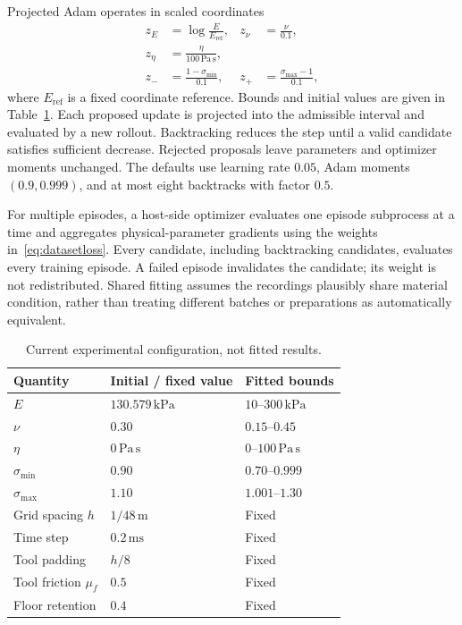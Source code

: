 Projected Adam operates in scaled coordinates
\begin{equation}
 \begin{aligned}
 z_E&=\log\frac{E}{E_{\mathrm{ref}}}, & z_\nu&=\frac{\nu}{0.1},\\
 z_\eta&=\frac{\eta}{100\,\mathrm{Pa\,s}},\\
 z_-&=\frac{1-\sigma_{\min}}{0.1}, & z_+&=\frac{\sigma_{\max}-1}{0.1},
 \end{aligned}
\end{equation}
where $E_{\mathrm{ref}}$ is a fixed coordinate reference. Bounds and initial values are given in Table~\ref{tab:settings}. Each proposed update is projected into the admissible interval and evaluated by a new rollout. Backtracking reduces the step until a valid candidate satisfies sufficient decrease. Rejected proposals leave parameters and optimizer moments unchanged. The defaults use learning rate $0.05$, Adam moments $(0.9,0.999)$, and at most eight backtracks with factor $0.5$.

For multiple episodes, a host-side optimizer evaluates one episode subprocess at a time and aggregates physical-parameter gradients using the weights in~\eqref{eq:datasetloss}. Every candidate, including backtracking candidates, evaluates every training episode. A failed episode invalidates the candidate; its weight is not redistributed. Shared fitting assumes the recordings plausibly share material condition, rather than treating different batches or preparations as automatically equivalent.

\begin{table}[t]
\centering
\caption{Current experimental configuration, not fitted results.}
\label{tab:settings}
\small
\begin{tabular}{@{}lll@{}}
\toprule
Quantity & Initial / fixed value & Fitted bounds\\
\midrule
$E$ & $130.579\,\mathrm{kPa}$ & $10$--$300\,\mathrm{kPa}$\\
$\nu$ & $0.30$ & $0.15$--$0.45$\\
$\eta$ & $0\,\mathrm{Pa\,s}$ & $0$--$100\,\mathrm{Pa\,s}$\\
$\sigma_{\min}$ & $0.90$ & $0.70$--$0.999$\\
$\sigma_{\max}$ & $1.10$ & $1.001$--$1.30$\\
\midrule
Grid spacing $h$ & $1/48\,\mathrm{m}$ & Fixed\\
Time step & $0.2\,\mathrm{ms}$ & Fixed\\
Tool padding & $h/8$ & Fixed\\
Tool friction $\mu_f$ & $0.5$ & Fixed\\
Floor retention & $0.4$ & Fixed\\
\bottomrule
\end{tabular}
\end{table}

